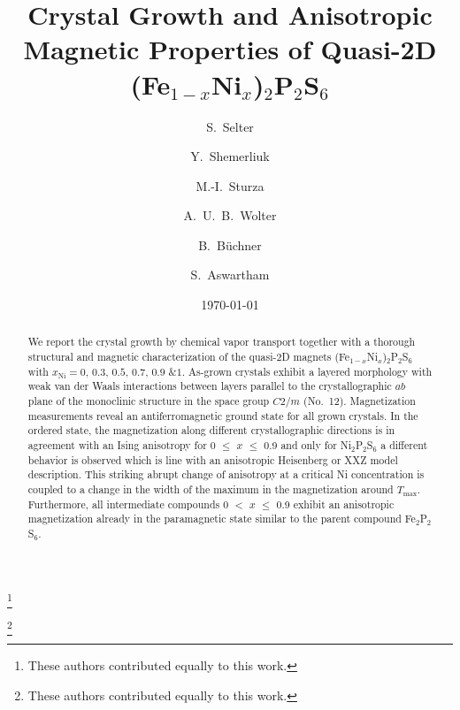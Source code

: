 \documentclass[twocolumn,superscriptaddress,prb,preprintnumbers,nobibnotes,aps]{revtex4-2}  %
\begin{document}
\title{Crystal Growth and Anisotropic Magnetic Properties of Quasi-2D (Fe$_{1-x}$Ni$_{x}$)$_{2}$P$_{2}$S$_{6}$}	

\author{S.~Selter}
\thanks{These authors contributed equally to this work.}
\author{Y.~Shemerliuk}
\thanks{These authors contributed equally to this work.}
\author{M.-I.~Sturza}
\author{A.~U.~B.~Wolter}
\author{B.~B\"{u}chner}
\author{S.~Aswartham}
\date{\today}

\begin{abstract}
We report the crystal growth by chemical vapor transport together with a thorough structural and magnetic characterization of the quasi-2D magnets (Fe$_{1-x}$Ni$_x$)$_2$P$_2$S$_6$ with $x_\textrm{Ni} = \textrm{0, 0.3, 0.5, 0.7, 0.9 \& 1}$. As-grown crystals exhibit a layered morphology with weak van der Waals interactions between layers parallel to the crystallographic $ab$ plane of the monoclinic structure in the space group $C2/m$ (No.~12). Magnetization measurements reveal an antiferromagnetic ground state for all grown crystals. In the ordered state, the magnetization along different crystallographic directions is in agreement with an Ising anisotropy for 0 $\leq$ $x$ $\leq$ 0.9 and only for Ni$_2$P$_2$S$_6$ a different behavior is observed which is line with an anisotropic Heisenberg or XXZ model description. This striking abrupt change of anisotropy at a critical Ni concentration is coupled to a change in the width of the maximum in the magnetization around $T_\textrm{max}$. Furthermore, all intermediate compounds 0 $<$ $x$ $\leq$ 0.9 exhibit an anisotropic magnetization already in the paramagnetic state similar to the parent compound Fe$_2$P$_2$S$_6$.
\end{abstract}
\end{document}
